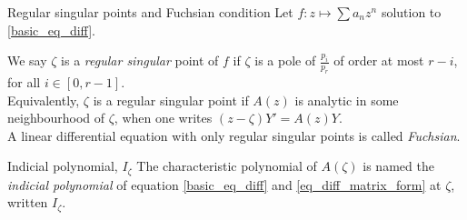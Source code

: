 \documentclass[../main.tex]{subfiles}
\begin{document}
\begin{definition}{Regular singular points and Fuchsian condition}
	Let $f : z \mapsto \sum a_n z^n$ solution to \ref{basic_eq_diff}.
	
	We say $\zeta$ is a \emph{regular singular} point of $f$ if $\zeta$ is a pole of $\frac{p_i}{p_r}$ of order at most $r - i$, for all $i \in [0, r - 1]$.\\
	
	Equivalently, $\zeta$ is a regular singular point if $A(z)$ is analytic in some neighbourhood of $\zeta$, when one writes $(z - \zeta)Y' = A(z) Y$.\\
	
	A linear differential equation with only regular singular points is called \emph{Fuchsian}.
\end{definition}

\begin{definition}{{Indicial polynomial, $I_\zeta$}}
	The characteristic polynomial of $A(\zeta)$ is named the \emph{indicial polynomial} of equation \ref{basic_eq_diff} and \ref{eq_diff_matrix_form} at $\zeta$, written $I_\zeta$.
\end{definition}
\end{document}
